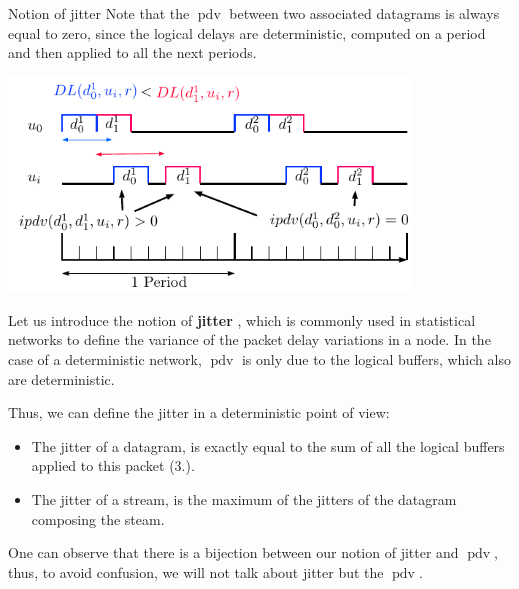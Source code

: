\documentclass[10pt]{article}
\DeclareMathOperator{\pdv}{pdv}
\begin{document}
\begin{subsection}{Notion of jitter}
Note that the $\pdv$ between two associated datagrams is always equal to zero, since the logical delays are deterministic, computed on a period and then applied to all the next periods.

\begin{center}
\includegraphics[width=0.8\textwidth]{ipdv}
  \end{center}
  
Let us introduce the notion of {\bf jitter} \cite{guillemin_peak_1992} , which is commonly used in statistical networks to define the variance of the packet delay variations in a node. In the case of a deterministic network, $\pdv$ is only due to the logical buffers, which also are deterministic. 

Thus, we can define the jitter in a deterministic point of view:
\begin{itemize}
\item The jitter of a datagram, is exactly equal to the sum of all the logical buffers applied to this packet (3.).
\item The jitter of a stream, is the maximum of the jitters of the datagram composing the steam.
\end{itemize}

One can observe that there is a bijection between our notion of jitter and $\pdv$, thus, to avoid confusion, we will not talk about jitter but the $\pdv$. 

  \end{subsection}
\end{document}
